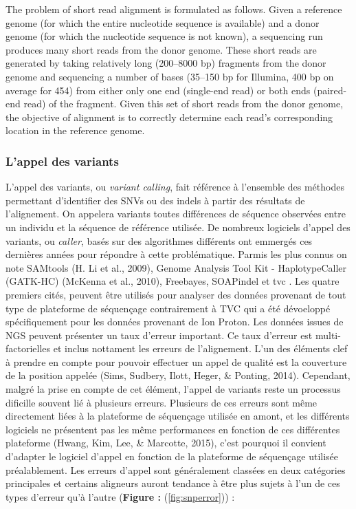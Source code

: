 \documentclass[12pt,twoside]{reedthesis}
\theoremstyle{definition}
\theoremstyle{definition}
\theoremstyle{remark}
\begin{document}
  The problem of short read alignment is formulated as follows. Given a
  reference genome (for which the entire nucleotide sequence is available)
  and a donor genome (for which the nucleotide sequence is not known), a
  sequencing run produces many short reads from the donor genome. These
  short reads are generated by taking relatively long (200--8000 bp)
  fragments from the donor genome and sequencing a number of bases
  (35--150 bp for Illumina, 400 bp on average for 454) from either only
  one end (single-end read) or both ends (paired-end read) of the
  fragment. Given this set of short reads from the donor genome, the
  objective of alignment is to correctly determine each read's
  corresponding location in the reference genome.
  
  \subsubsection{L'appel des variants}\label{lappel-des-variants}
  
  L'appel des variants, ou \emph{variant calling}, fait référence à
  l'ensemble des méthodes permettant d'identifier des SNVs ou des indels à
  partir des résultats de l'alignement. On appelera variants toutes
  différences de séquence observées entre un individu et la séquence de
  référence utilisée. De nombreux logiciels d'appel des variants, ou
  \emph{caller}, basés sur des algorithmes différents ont emmergés ces
  dernières années pour répondre à cette problématique. Parmis les plus
  connus on note SAMtools (H. Li et al., 2009), Genome Analysis Tool Kit -
  HaplotypeCaller (GATK-HC) (McKenna et al., 2010), Freebayes, SOAPindel
  et tvc . Les quatre premiers cités, peuvent être utilisés pour analyser
  des données provenant de tout type de plateforme de séquençage
  contrairement à TVC qui a été dévoeloppé spécifiquement pour les données
  provenant de Ion Proton. Les données issues de NGS peuvent présenter un
  taux d'erreur important. Ce taux d'erreur est multi-factorielles et
  inclus nottament les erreurs de l'alignement. L'un des éléments clef à
  prendre en compte pour pouvoir effectuer un appel de qualité est la
  couverture de la position appelée (Sims, Sudbery, Ilott, Heger, \&
  Ponting, 2014). Cependant, malgré la prise en compte de cet élément,
  l'appel de variants reste un processus dificille souvent lié à plusieurs
  erreurs. Plusieurs de ces erreurs sont même directement liées à la
  plateforme de séquençage utilisée en amont, et les différents logiciels
  ne présentent pas les même performances en fonction de ces différentes
  plateforme (Hwang, Kim, Lee, \& Marcotte, 2015), c'est pourquoi il
  convient d'adapter le logiciel d'appel en fonction de la plateforme de
  séquençage utilisée préalablement. Les erreurs d'appel sont généralement
  classées en deux catégories principales et certains aligneurs auront
  tendance à être plus sujets à l'un de ces types d'erreur qu'à l'autre
  (\textbf{Figure : }(\ref{fig:snperror})) :
  
\end{document}

